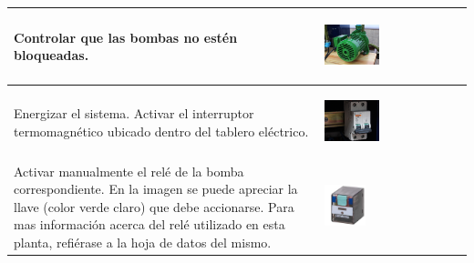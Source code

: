 \begin{table}[H]
\centering
\renewcommand*{\arraystretch}{0.01}
\begin{tabular}{*{2}{m{}}}
\hline
  Controlar que las bombas no estén bloqueadas.
  &\begin{center}
    \includegraphics[width=0.4\textwidth]
      {Anexos/images/bombaBottom.JPG}
  \end{center}\\
\hline
    Energizar el sistema. Activar el interruptor termomagnético ubicado dentro
    del tablero eléctrico.
    &\begin{center}
      \includegraphics[width=0.4\textwidth]
	{Anexos/images/disyuntor.JPG}
    \end{center}\\
\hline
    Activar manualmente el relé de la bomba correspondiente. En la imagen se
    puede apreciar la llave (color verde claro) que debe accionarse. Para mas 
    información acerca del relé utilizado en esta planta, refiérase a la
    hoja de datos del mismo.
    &\begin{center}
      \includegraphics[width=0.3\textwidth]{Anexos/images/rele.pdf}
    \end{center}\\
\hline
\end{tabular}
\end{table}

